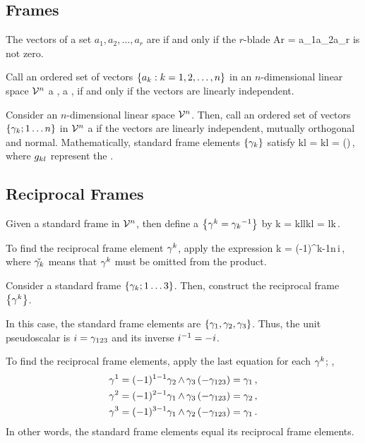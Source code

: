 \subsection{Frames}
The vectors of a set $a_1,a_2,\dotsc,a_r$ are  if and only if the $r$-blade
\beq
\sclif Ar = a_1\oprod a_2\oprod\dotsb\oprod a_r
\eeq
is not zero.

Call an ordered set of vectors $\left\lbrace{{a_k}:{k=1,2,\dotsc,n}}\right\rbrace$ in an $n$-dimensional linear space $\mathcal{V}^{n}$ a , \aka a , if and only if the vectors are linearly independent.

Consider an $n$-dimensional linear space $\mathcal{V}^{n}$. Then, call an ordered set of vectors $\left\lbrace{\gamma_{k};{1}\dotsc{n}}\right\rbrace$ in $\mathcal{V}^{n}$ a  if the vectors are linearly independent, mutually orthogonal and normal. Mathematically, standard frame elements $\left\lbrace{\gamma_{k}}\right\rbrace$ satisfy
\beq
\imet kl = \ifvec k\iprod\ifvec l = ()\,,
\eeq
where $g_{{k}{l}}$ represent the .


\subsection{Reciprocal Frames}
Given a standard frame in $\mathcal{V}^{n}$, then define a  $\left\lbrace{\gamma^{k} = {\gamma_{k}}^{-1}}\right\rbrace$ by 
\beq
\ifvec k = \imet kl\rfvec l\qquad{}\qquad\ifvec k\iprod\rfvec l = \mkron lk\,.
\eeq 

To find the reciprocal frame element $\gamma^{k}$, apply the expression
\beq
\rfvec k = (-1)^{k-1}\oprod\dotsb\oprod{}\oprod\dotsc\ifvec n\,\inv i\,,
\eeq
where $\check{\gamma_{k}}$ means that $\gamma^{k}$ must be omitted from the product.

\begin{example}
Consider a standard frame $\left\lbrace{\gamma_{k};{1}\dotsc{3}}\right\rbrace$. Then, construct the reciprocal frame $\left\lbrace{\gamma^{k}}\right\rbrace$.
\end{example}

\begin{solution}
In this case, the standard frame elements are $\left\lbrace{\gamma_{1}, \gamma_{2}, \gamma_{3}}\right\rbrace$. Thus, the unit pseudoscalar is $i = \gamma_{123}$ and its inverse ${i}^{-1} = -i$.

To find the reciprocal frame elements, apply the last equation for each $\gamma^{k}$; \ie,
\begin{align*}
\gamma^{1} = (-1)^{1-1}\gamma_{2}\operatorname{\wedge}\gamma_{3}\,(-\gamma_{123}) = \gamma_{1}\,,\\
\gamma^{2} = (-1)^{2-1}\gamma_{1}\operatorname{\wedge}\gamma_{3}\,(-\gamma_{123}) = \gamma_{2}\,,\\
\gamma^{3} = (-1)^{3-1}\gamma_{1}\operatorname{\wedge}\gamma_{2}\,(-\gamma_{123}) = \gamma_{1}\,.
\end{align*}
In other words, the standard frame elements equal its reciprocal frame elements.
\end{solution}


